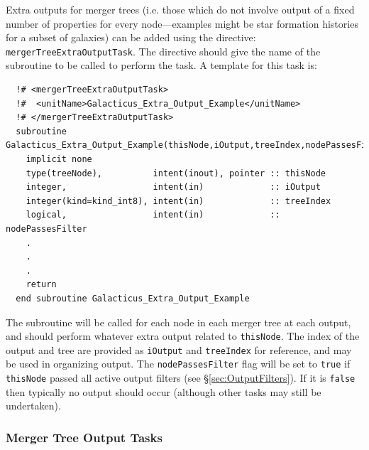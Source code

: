 Extra outputs for merger trees (i.e. those which do not involve output of a fixed number of properties for every node---examples might be star formation histories for a subset of galaxies) can be added using the directive: {\tt mergerTreeExtraOutputTask}. The directive should give the name of the subroutine to be called to perform the task. A template for this task is:
\begin{verbatim}
  !# <mergerTreeExtraOutputTask>
  !#  <unitName>Galacticus_Extra_Output_Example</unitName>
  !# </mergerTreeExtraOutputTask>
  subroutine Galacticus_Extra_Output_Example(thisNode,iOutput,treeIndex,nodePassesFilter)
    implicit none
    type(treeNode),          intent(inout), pointer :: thisNode
    integer,                 intent(in)             :: iOutput
    integer(kind=kind_int8), intent(in)             :: treeIndex
    logical,                 intent(in)             :: nodePassesFilter
    .
    .
    .
    return
  end subroutine Galacticus_Extra_Output_Example
\end{verbatim}
The subroutine will be called for each node in each merger tree at each output, and should perform whatever extra output related to {\tt thisNode}. The index of the output and tree are provided as {\tt iOutput} and {\tt treeIndex} for reference, and may be used in organizing output. The {\tt nodePassesFilter} flag will be set to {\tt true} if {\tt thisNode} passed all active output filters (see \S\ref{sec:OutputFilters}). If it is {\tt false} then typically no output should occur (although other tasks may still be undertaken).

\subsubsection{Merger Tree Output Tasks}

